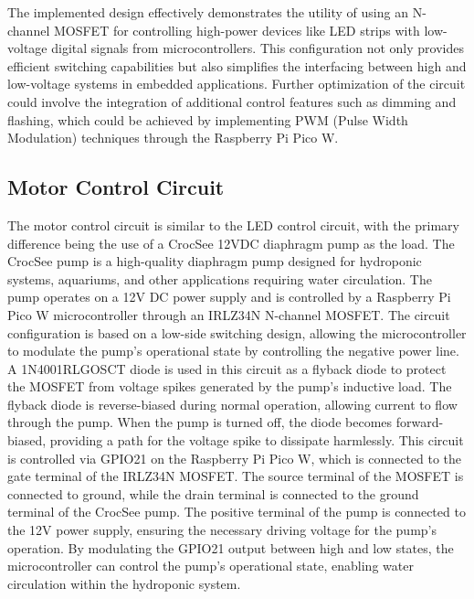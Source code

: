 \documentclass[12pt]{article} %
\begin{document}
\newline
\newline
\noindent The implemented design effectively demonstrates the utility of using an N-channel MOSFET for controlling high-power devices like LED strips with low-voltage digital signals from microcontrollers. This configuration not only provides efficient switching capabilities but also simplifies the interfacing between high and low-voltage systems in embedded applications. Further optimization of the circuit could involve the integration of additional control features such as dimming and flashing, which could be achieved by implementing PWM (Pulse Width Modulation) techniques through the Raspberry Pi Pico W.

\subsection{Motor Control Circuit}
\noindent The motor control circuit is similar to the LED control circuit, with the primary difference being the use of a CrocSee 12VDC diaphragm pump as the load. The CrocSee pump is a high-quality diaphragm pump designed for hydroponic systems, aquariums, and other applications requiring water circulation. The pump operates on a 12V DC power supply and is controlled by a Raspberry Pi Pico W microcontroller through an IRLZ34N N-channel MOSFET. The circuit configuration is based on a low-side switching design, allowing the microcontroller to modulate the pump's operational state by controlling the negative power line.
\newline
\newline
\noindent A 1N4001RLGOSCT diode \cite{ref_diode} is used in this circuit as a flyback diode to protect the MOSFET from voltage spikes generated by the pump's inductive load. The flyback diode is reverse-biased during normal operation, allowing current to flow through the pump. When the pump is turned off, the diode becomes forward-biased, providing a path for the voltage spike to dissipate harmlessly.
\newline
\newline
\noindent This circuit is controlled via GPIO21 on the Raspberry Pi Pico W, which is connected to the gate terminal of the IRLZ34N MOSFET. The source terminal of the MOSFET is connected to ground, while the drain terminal is connected to the ground terminal of the CrocSee pump. The positive terminal of the pump is connected to the 12V power supply, ensuring the necessary driving voltage for the pump's operation. By modulating the GPIO21 output between high and low states, the microcontroller can control the pump's operational state, enabling water circulation within the hydroponic system. 
\end{document}
